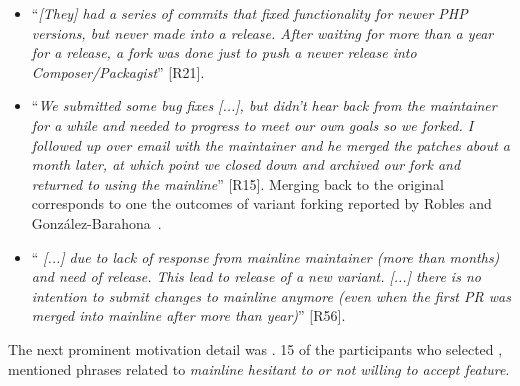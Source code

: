 \begin{itemize}[leftmargin=*]
\item ``\emph{[They] %
had a series of commits that fixed functionality for newer PHP versions, but never made into a release. %
After waiting for more than a year for a release, a fork was done just to push a newer release into Composer/Packagist}'' [R21].

\item ``\emph{We submitted some bug fixes [...], %
but didn't hear back from the maintainer for a while and needed to progress to meet our own goals so we forked. I followed up over email with the maintainer and he merged the patches about a month later, at which point we closed down and archived our fork and returned to using the mainline}'' [R15].
Merging back to the original corresponds to one the outcomes of variant forking reported by Robles and Gonz{\'a}lez-Barahona~\cite{Gregorio:2012}.

\item ``\emph{%
[...] due to lack of response from mainline maintainer (more than months) and need of release. This lead to release of a new variant. [...] there is no intention to submit changes to mainline anymore (even when the first PR was merged into mainline after more than year)}'' [R56].
\end{itemize}

\nd The next prominent  motivation detail was .
15 of the participants who selected , mentioned phrases related to \emph{mainline hesitant to or not willing to accept feature}.

